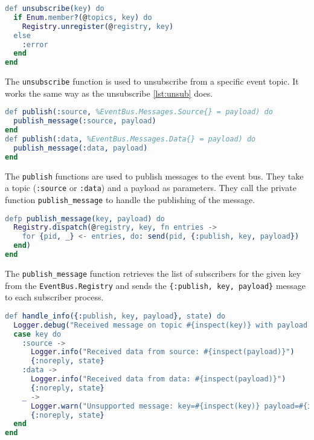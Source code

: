 \begin{lstlisting}[language=erlang, caption={Unsubscribe to event topic on event\_bus.ex}]
def unsubscribe(key) do
  if Enum.member?(@topics, key) do
    Registry.unregister(@registry, key)
  else
    :error
  end
end
\end{lstlisting}

The \texttt{unsubscribe} function is used to unsubscribe from a specific event topic. It works the same way as the unsubscribe \ref{lst:unsub} does.\newline

\begin{lstlisting}[language=erlang, caption={Publish message on event\_bus.ex}]
def publish(:source, %EventBus.Messages.Source{} = payload) do
  publish_message(:source, payload)
end
def publish(:data, %EventBus.Messages.Data{} = payload) do
  publish_message(:data, payload)
end
\end{lstlisting}

The \texttt{publish} functions are used to publish messages to the event bus. They take a topic (\texttt{:source} or \texttt{:data}) and a payload as parameters. They call the private function \texttt{publish\_message} to handle the publishing of the message.\newline

\begin{lstlisting}[language=erlang, caption={Publish message's subscribers on event\_bus.ex}]
defp publish_message(key, payload) do
  Registry.dispatch(@registry, key, fn entries ->
    for {pid, _} <- entries, do: send(pid, {:publish, key, payload})
  end)
end
\end{lstlisting}

The \texttt{publish\_message} function retrieves the list of subscribers for the given key from the \texttt{EventBus.Registry} and sends the \texttt{\{:publish, key, payload\}} message to each subscriber process.\newline

\begin{lstlisting}[language=erlang, caption={Handle\_info on event\_bus.ex}]
def handle_info({:publish, key, payload}, state) do
  Logger.debug("Received message on topic #{inspect(key)} with payload: #{inspect(payload)}")
  case key do
    :source ->
      Logger.info("Received data from source: #{inspect(payload)}")
      {:noreply, state}
    :data ->
      Logger.info("Received data from data: #{inspect(payload)}")
      {:noreply, state}
    _ ->
      Logger.warn("Unsupported message: key=#{inspect(key)} payload=#{inspect(payload)}")
      {:noreply, state}
  end
end
\end{lstlisting}

